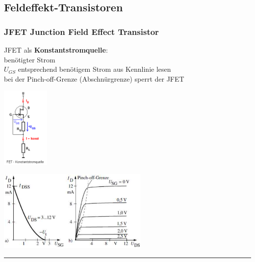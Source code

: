 \subsection{Feldeffekt-Transistoren}

            \subsubsection{JFET Junction Field Effect Transistor}
            \begin{minipage}[T]{8cm}
                JFET als {\bf Konstantstromquelle}:\\
                benötigter Strom \\
                $U_{GS}$ entsprechend benötigem Strom aus Kennlinie lesen\\
                bei der Pinch-off-Grenze (Abschnürgrenze) sperrt der JFET
            \end{minipage}
            \begin{minipage}[T]{3.4cm}
                \includegraphics[height=4cm]{./images/JFETCCQuelle.png}
            \end{minipage}
            \begin{minipage}[T]{6cm}
                \includegraphics[height=4cm]{./images/JFETKennlinie.png}
            \end{minipage}
\hrule
